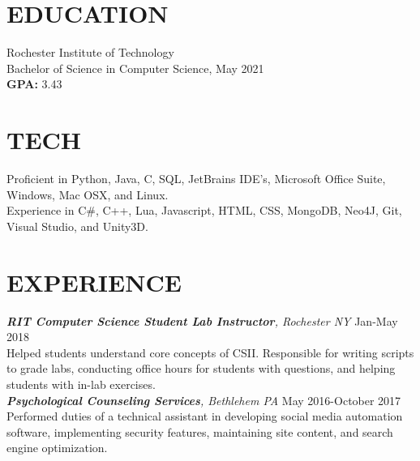 \documentclass[line, margin]{res}
\begin{document}
\address{(484) 554-8487\\ emp9173@rit.edu}





 
 
 
\begin{resume}
\section{EDUCATION} 
 Rochester Institute of Technology \\
 Bachelor of Science in Computer Science, May 2021\\
 \textbf{GPA:} 3.43
 
\section{TECH}
Proficient in Python, Java, C, SQL, JetBrains IDE’s, Microsoft Office Suite, Windows, Mac OSX, and Linux. \\
Experience in C\#, C++, Lua, Javascript, HTML, CSS, MongoDB, Neo4J, Git, Visual Studio, and Unity3D.
 
\section{EXPERIENCE} 
\textit{\textbf{RIT Computer Science Student Lab Instructor}, Rochester NY} \hfill Jan-May 2018 \\
Helped students understand core concepts of CSII. Responsible for writing scripts
to grade labs, conducting office hours for students with questions, and helping students
with in-lab exercises.\\ [10pt]
\textit{\textbf{Psychological Counseling Services}, Bethlehem PA} \hfill May 2016-October 2017 \\
Performed duties of a technical assistant in developing social media automation
software, implementing security features, maintaining site content, and
search engine optimization.
 

\end{resume}
\end{document}
